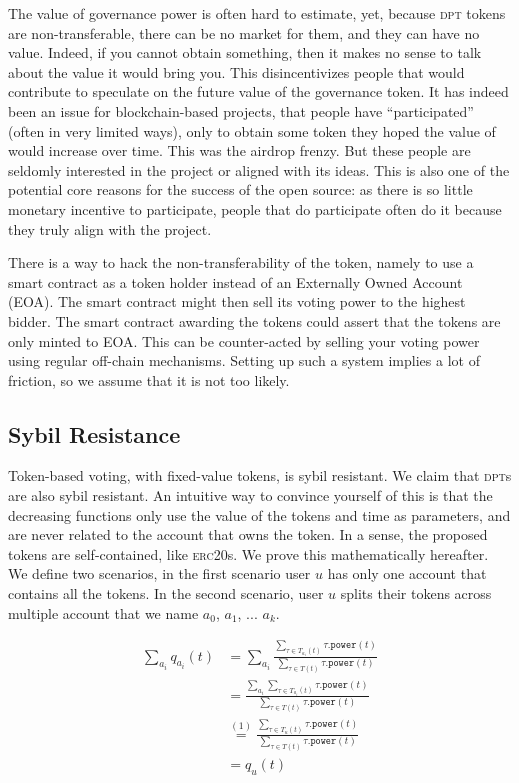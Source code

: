 The value of governance power is often hard to estimate, yet, because \textsc{dpt} tokens are non-transferable, there can be no market for them, and they can have no value.
Indeed, if you cannot obtain something, then it makes no sense to talk about the value it would bring you.
This disincentivizes people that would contribute to speculate on the future value of the governance token.
It has indeed been an issue for blockchain-based projects, that people have \enquote{participated} (often in very limited ways), only to obtain some token they hoped the value of would increase over time.
This was the airdrop frenzy.
But these people are seldomly interested in the project or aligned with its ideas.
This is also one of the potential core reasons for the success of the open source: as there is so little monetary incentive to participate, people that do participate often do it because they truly align with the project.

There is a way to hack the non-transferability of the token, namely to use a smart contract as a token holder instead of an Externally Owned Account (EOA).
The smart contract might then sell its voting power to the highest bidder.
The smart contract awarding the tokens could assert that the tokens are only minted to EOA.
This can be counter-acted by selling your voting power using regular off-chain mechanisms.
Setting up such a system implies a lot of friction, so we assume that it is not too likely.

\subsection{Sybil Resistance}

Token-based voting, with fixed-value tokens, is sybil resistant.
We claim that \textsc{dpt}s are also sybil resistant.
An intuitive way to convince yourself of this is that the decreasing functions only use the value of the tokens and time as parameters, and are never related to the account that owns the token.
In a sense, the proposed tokens are self-contained, like \textsc{erc20}s.
We prove this mathematically hereafter.
We define two scenarios, in the first scenario user $u$ has only one account that contains all the tokens.
In the second scenario, user $u$ splits their tokens across multiple account that we name $a_0$, $a_1$, ... $a_k$.

\begin{align*}
  \sum_{a_i} q_{a_i}(t) &= \sum_{a_i}\frac{\sum_{\tau\in T_{a_i}(t)}\tau\mathtt{.power}(t)}{\sum_{\tau\in T(t)}\tau\mathtt{.power}(t)}\\
  &= \frac{\sum_{a_i}\sum_{\tau\in T_{a_i}(t)}\tau\mathtt{.power}(t)}{\sum_{\tau\in T(t)}\tau\mathtt{.power}(t)}\\
  &\overset{(1)}{=} \frac{\sum_{\tau\in T_u(t)}\tau\mathtt{.power}(t)}{\sum_{\tau\in T(t)}\tau\mathtt{.power}(t)}\\
  &= q_u(t)\\
\end{align*}

